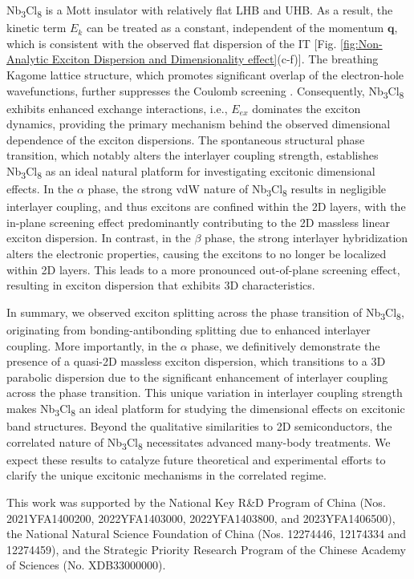 \documentclass[twocolumn,prl,showpacs,superscriptaddress,longbibliography]{revtex4-2}
\begin{document}
Nb\textsubscript{3}Cl\textsubscript{8} is a Mott insulator with
relatively flat LHB and UHB. As a result, the kinetic term $E_{k}$
can be treated as a constant, independent of the momentum $\boldsymbol{q}$,
which is consistent with the observed flat dispersion of the IT {[}Fig.
\ref{fig:Non-Analytic Exciton Dispersion and Dimensionality effect}(c-f){]}.
The breathing Kagome lattice structure, which promotes significant
overlap of the electron-hole wavefunctions, further suppresses the
Coulomb screening \citep{RN639,RN634}. Consequently, Nb\textsubscript{3}Cl\textsubscript{8}
exhibits enhanced exchange interactions, i.e., $E_{ex}$ dominates
the exciton dynamics, providing the primary mechanism behind the observed
dimensional dependence of the exciton dispersions. The spontaneous
structural phase transition, which notably alters the interlayer coupling
strength, establishes Nb\textsubscript{3}Cl\textsubscript{8} as
an ideal natural platform for investigating excitonic dimensional
effects. In the $\alpha$ phase, the strong vdW nature of Nb\textsubscript{3}Cl\textsubscript{8}
results in negligible interlayer coupling, and thus excitons are confined
within the 2D layers, with the in-plane screening effect \citep{RN608,RN589,RN580}
predominantly contributing to the 2D massless linear exciton dispersion.
In contrast, in the $\beta$ phase, the strong interlayer hybridization
alters the electronic properties, causing the excitons to no longer
be localized within 2D layers. This leads to a more pronounced out-of-plane
screening effect, resulting in exciton dispersion that exhibits 3D
characteristics.

In summary, we observed exciton splitting across the phase transition
of Nb\textsubscript{3}Cl\textsubscript{8}, originating from bonding-antibonding
splitting due to enhanced interlayer coupling. More importantly, in
the $\alpha$ phase, we definitively demonstrate the presence of a
quasi-2D massless exciton dispersion, which transitions to a 3D parabolic
dispersion due to the significant enhancement of interlayer coupling
across the phase transition. This unique variation in interlayer coupling
strength makes Nb\textsubscript{3}Cl\textsubscript{8} an ideal platform
for studying the dimensional effects on excitonic band structures.
Beyond the qualitative similarities to 2D semiconductors, the correlated
nature of Nb\textsubscript{3}Cl\textsubscript{8} necessitates advanced
many-body treatments. We expect these results to catalyze future theoretical
and experimental efforts to clarify the unique excitonic mechanisms
in the correlated regime.
\begin{acknowledgments}
This work was supported by the National Key R\&D Program of China
(Nos. 2021YFA1400200, 2022YFA1403000, 2022YFA1403800, and 2023YFA1406500),
the National Natural Science Foundation of China (Nos. 12274446, 12174334
and 12274459), and the Strategic Priority Research Program of the
Chinese Academy of Sciences (No. XDB33000000).
\end{acknowledgments}
\end{document}
